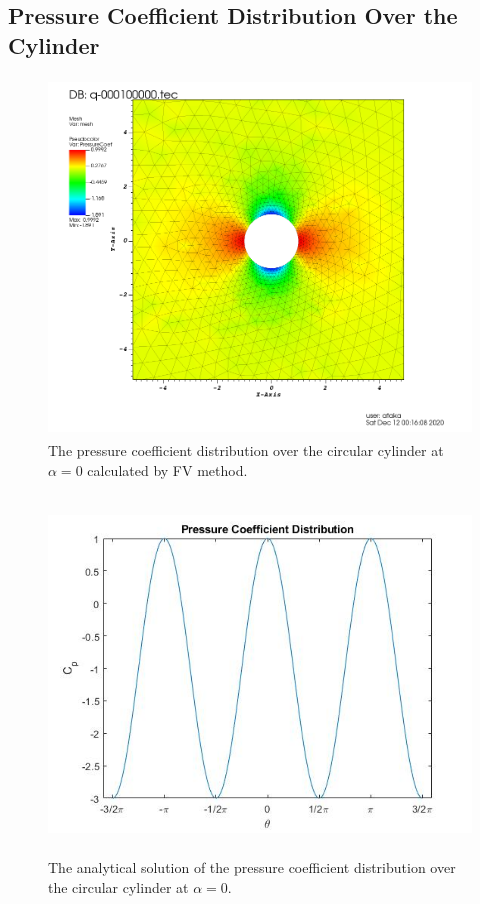\documentclass[letterpaper,12pt]{article}
\begin{document}
\subsection{Pressure Coefficient Distribution Over the Cylinder}
\begin{figure} [ht]
	\centering
	\includegraphics[height = 9.5cm]{graph/0deg/Cylinder_0angle_pressure0001.png}
	\caption{The pressure coefficient distribution over the circular cylinder at $\alpha=0$ calculated by FV method.}
	\label{fig:q3fv}
\end{figure}
\begin{figure} [ht]
	\centering
	\includegraphics[height = 9.5cm]{graph/0deg/pc_analytical.jpg}
	\caption{The analytical solution of the pressure coefficient distribution over the circular cylinder at $\alpha=0$.}
	\label{fig:q3a}
\end{figure}
\end{document}
